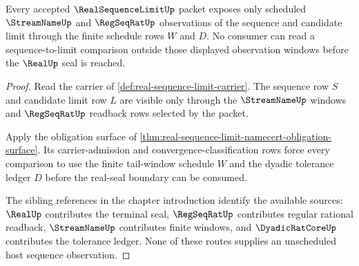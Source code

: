 \begin{theorem}\label{thm:realsequencelimit-observation-tail-carrier}
Every accepted $\RealSequenceLimitUp$ packet exposes only scheduled $\StreamNameUp$ and $\RegSeqRatUp$ observations of the sequence and candidate limit through the finite schedule rows $W$ and $D$. No consumer can read a sequence-to-limit comparison outside those displayed observation windows before the $\RealUp$ seal is reached.
\end{theorem}
\begin{proof}
Read the carrier of \autoref{def:real-sequence-limit-carrier}. The sequence row $S$ and candidate limit row $L$ are visible only through the $\StreamNameUp$ windows and $\RegSeqRatUp$ readback rows selected by the packet.

Apply the obligation surface of \autoref{thm:real-sequence-limit-namecert-obligation-surface}. Its carrier-admission and convergence-classification rows force every comparison to use the finite tail-window schedule $W$ and the dyadic tolerance ledger $D$ before the real-seal boundary can be consumed.

The sibling references in the chapter introduction identify the available sources: $\RealUp$ contributes the terminal seal, $\RegSeqRatUp$ contributes regular rational readback, $\StreamNameUp$ contributes finite windows, and $\DyadicRatCoreUp$ contributes the tolerance ledger. None of these routes supplies an unscheduled host sequence observation.
\end{proof}

